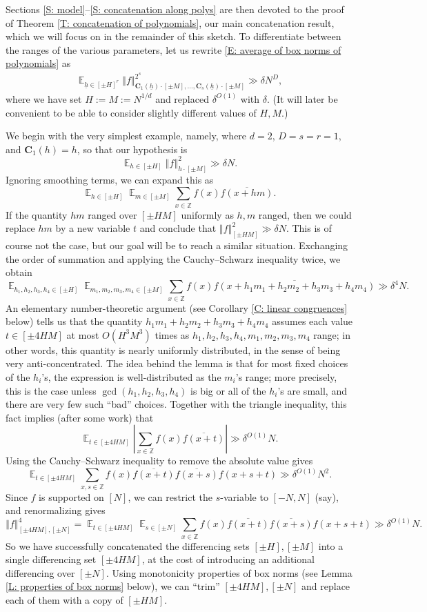 \documentclass[11pt]{amsart}
\theoremstyle{definition}
\DeclareMathOperator*{\E}{\mathbb{E}}
\newcommand{\Z}{{\mathbb Z}}
\newcommand{\bc}{{\textbf{C}}}
\newcommand{\uh}{{\underline{h}}}
\newcommand{\norm}[1]{\left\Vert #1\right\Vert}
\newcommand{\abs}[1]{\mathopen{}\left| #1\mathclose{}\right|}
\begin{document}
Sections \ref{S: model}--\ref{S: concatenation along polys} are then devoted to the proof of Theorem \ref{T: concatenation of polynomials}, our main concatenation result, which we will focus on in the remainder of this sketch.  To differentiate between the ranges of the various parameters, let us rewrite \eqref{E: average of box norms of polynomials} as
\begin{align}\label{E: PET output}
    \E_{\uh\in[\pm H]^{r}}\norm{f}_{{\bc_1(\uh)\cdot[\pm M]}, \ldots, {\bc_s(\uh)\cdot[\pm M]}}^{2^s} \gg \delta N^D,
\end{align}
where we have set $H:=M:=N^{1/d}$ and replaced $\delta^{O(1)}$ with $\delta$.  (It will later be convenient to be able to consider slightly different values of $H,M$.)

We begin with the very simplest example, namely, where $d=2$, $D=s=r=1$, and $\bc_1(h)=h$, so that our hypothesis is
$$\E_{h \in [\pm H]} \norm{f}^2_{h \cdot [\pm M]} \gg \delta N.$$
Ignoring smoothing terms, we can expand this as
$$\E_{h \in [ \pm H]} \E_{m \in [\pm M]} \sum_{x \in \mathbb{Z}} f(x)\overline{f(x+hm)}.$$
If the quantity $hm$ ranged over $[\pm HM]$ uniformly as $h,m$ ranged, then we could replace $hm$ by a new variable $t$ and conclude that $\norm{f}_{[\pm HM]}^2 \gg \delta N$.  This is of course not the case, but our goal will be to reach a similar situation.  Exchanging the order of summation and applying the Cauchy--Schwarz inequality twice, we obtain
$$\E_{h_1,h_2,h_3,h_4 \in [\pm H]}\E_{m_1,m_2,m_3,m_4 \in [\pm M]} \sum_{x \in \Z}f(x) \overline{f(x+h_1m_1+h_2m_2+h_3m_3+h_4m_4)} \gg \delta^4 N.$$
An elementary number-theoretic argument (see Corollary \ref{C: linear congruences} below) tells us that the quantity $h_1m_1+h_2m_2+h_3m_3+h_4m_4$ assumes each value $t \in [\pm 4HM]$ at most $O(H^3M^3)$ times as $h_1,h_2,h_3,h_4,m_1,m_2,m_3,m_4$ range; in other words, this quantity is nearly uniformly distributed, in the sense of being very anti-concentrated.  The idea behind the lemma is that for most fixed choices of the $h_i$'s, the expression is well-distributed as the $m_i$'s range; more precisely, this is the case unless $\gcd(h_1,h_2,h_3,h_4)$ is big or all of the $h_i$'s are small, and there are very few such ``bad'' choices.  
Together with the triangle inequality, this fact implies (after some work) that
$$\E_{t \in [\pm 4HM
]}\abs{\sum_{x \in \Z} f(x)\overline{f(x+t)}} \gg \delta^{O(1)} N.$$
Using the Cauchy--Schwarz inequality to remove the absolute value gives
$$\E_{t \in [\pm 4HM
]}\sum_{x,s \in \Z} f(x)\overline{f(x+t)}\overline{f(x+s)}f(x+s+t) \gg \delta^{O(1)} N^2.$$
Since $f$ is supported on $[N]$, we can restrict the $s$-variable to $[-N,N]$ (say), and renormalizing gives
$$\norm{f}^4_{[\pm 4HM],[\pm N]}=\E_{t \in [\pm 4HM]}\E_{s \in [\pm N]}\sum_{x \in \Z}f(x)\overline{f(x+t)}\overline{f(x+s)}f(x+s+t) \gg \delta^{O(1)} N.$$
So we have successfully concatenated the differencing sets $[\pm H], [\pm M]$ into a single differencing set $[\pm 4HM]$, at the cost of introducing an additional differencing over $[\pm N]$.  Using monotonicity properties of box norms (see Lemma \ref{L: properties of box norms} below), we can ``trim'' $[\pm 4HM],[\pm N]$ and replace each of them with a copy of $[\pm HM]$.
\end{document}
